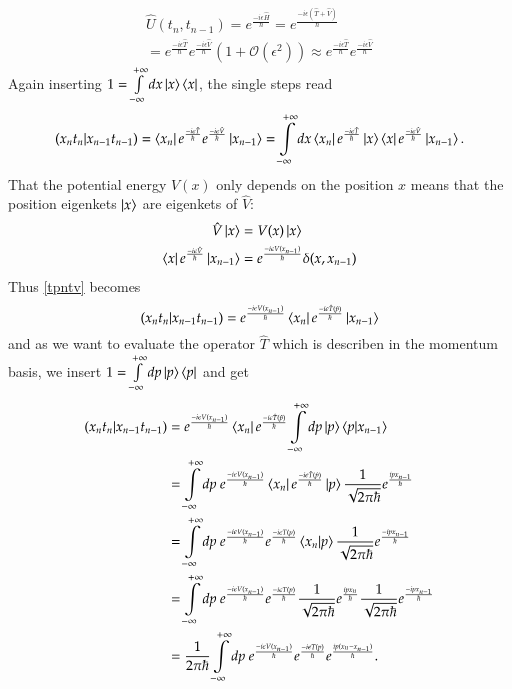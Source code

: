 \begin{align}\label{UTV}
  \hat{U}(t_{n},t_{n-1}) = e^{\frac{-i \epsilon \hat{H}}{\hbar}} = e^{\frac{-i \epsilon (\hat T + \hat V)}{\hbar}} \\
  = e^{\frac{-i \epsilon \hat{T}}{\hbar}} e^{\frac{-i \epsilon \hat{V}}{\hbar}} (1 + \mathcal{O} (\epsilon^2) ) \approx e^{\frac{-i \epsilon \hat{T}}{\hbar}} e^{\frac{-i \epsilon \hat{V}}{\hbar}} 
\end{align}
Again inserting $1 = \int\limits_{-\infty}^{+\infty} dx \ket{x}\bra{x}$, the single steps read
\begin{equation}\label{tpntv}
  (x_n t_n | x_{n-1} t_{n-1}) = \bra{x_n} e^{\frac{-i \epsilon \hat{T}}{\hbar}} e^{\frac{-i \epsilon \hat{V}}{\hbar}}  \ket{x_{n-1}} = \int\limits_{-\infty}^{+\infty} dx \bra{x_n} e^{\frac{-i \epsilon \hat{T}}{\hbar}} \ket{x} \bra{x} e^{\frac{-i \epsilon \hat{V}}{\hbar}}  \ket{x_{n-1}}.
\end{equation}
That the potential energy $V(x)$ only depends on the position $x$ means that the position eigenkets $\ket{x}$ are eigenkets of $\hat{V}$:
\begin{align}\label{Vx}
  \hat{V} \ket{x} &= V(x) \ket{x}  \\
  \bra{x} e^{\frac{-i \epsilon \hat{V}}{\hbar}}  \ket{x_{n-1}} &= e^{\frac{-i \epsilon V(x_{n-1})}{\hbar}} \delta (x,x_{n-1})
\end{align}
Thus \ref{tpntv} becomes
\begin{equation}\label{tpni}
   (x_n t_n | x_{n-1} t_{n-1}) = e^{\frac{-i \epsilon V(x_{n-1})}{\hbar}} \bra{x_n} e^{\frac{-i \epsilon \hat{T}(\hat{p})}{\hbar}} \ket{x_{n-1}}
\end{equation}
and as we want to evaluate the operator $\hat{T}$ which is describen in the momentum basis, we insert $1 = \int\limits_{-\infty}^{+\infty} dp \ket{p}\bra{p}$ and get
\begin{align}\label{tpnp}
   (x_n t_n | x_{n-1} t_{n-1})  &= e^{\frac{-i \epsilon V(x_{n-1})}{\hbar}} \bra{x_n} e^{\frac{-i \epsilon \hat{T}(\hat{p})}{\hbar}} \int\limits_{-\infty}^{+\infty} dp \ket{p}\braket{p|x_{n-1}} \\
                                &= \int\limits_{-\infty}^{+\infty} dp \ e^{\frac{-i \epsilon V(x_{n-1})}{\hbar}} \bra{x_n} e^{\frac{-i \epsilon \hat{T}(\hat{p})}{\hbar}} \ket{p} \frac{1}{\sqrt{2 \pi \hbar}} e^{\frac{i p x_{n-1}}{\hbar}} \\
                                &= \int\limits_{-\infty}^{+\infty} dp \ e^{\frac{-i \epsilon V(x_{n-1})}{\hbar}} e^{\frac{-i \epsilon T(p)}{\hbar}} \braket{x_n|p} \frac{1}{\sqrt{2 \pi \hbar}} e^{\frac{- i p x_{n-1}}{\hbar}} \\
                                &= \int\limits_{-\infty}^{+\infty} dp \ e^{\frac{-i \epsilon V(x_{n-1})}{\hbar}} e^{\frac{-i \epsilon T(p)}{\hbar}} \frac{1}{\sqrt{2 \pi \hbar}} e^{\frac{i p x_{n}}{\hbar}} \frac{1}{\sqrt{2 \pi \hbar}} e^{\frac{- i p x_{n-1}}{\hbar}}  \\
                                &= \frac{1}{2 \pi \hbar} \int\limits_{-\infty}^{+\infty} dp \ e^{\frac{-i \epsilon V(x_{n-1})}{\hbar}} e^{\frac{-i \epsilon T(p)}{\hbar}} e^{\frac{i p (x_{n} -x_{n-1})}{\hbar}}.
\end{align}
